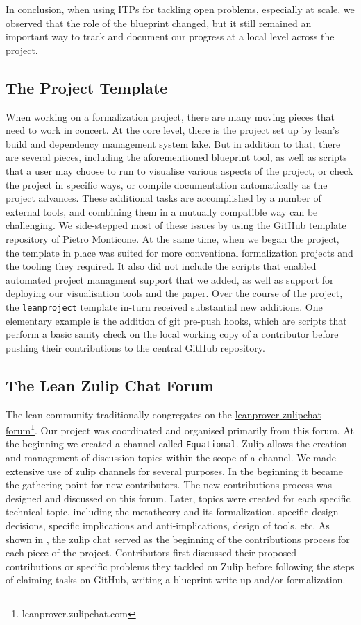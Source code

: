 In conclusion, when using ITPs for tackling open problems, especially at scale, we observed that the role of the blueprint changed, but it still remained an important way to track and document our progress at a local level across the project.

\subsection{The Project Template}
When working on a formalization project, there are many moving pieces that need to work in concert. At the core level, there is the project set up by lean's build and dependency management system lake. But in addition to that, there are several pieces, including the aforementioned blueprint tool, as well as scripts that a user may choose to run to visualise various aspects of the project, or check the project in specific ways, or compile documentation automatically as the project advances. These additional tasks are accomplished by a number of external tools, and combining them in a mutually compatible way can be challenging. We side-stepped most of these issues by using the GitHub template repository of Pietro Monticone\cite{Monticone_LeanProject_2025}. At the same time, when we began the project, the template in place was suited for more conventional formalization projects and the tooling they required. It also did not include the scripts that enabled automated project managment support that we added, as well as support for deploying our visualisation tools and the paper. Over the course of the project, the \texttt{leanproject} template in-turn received substantial new additions. One elementary example is the addition of git pre-push hooks, which are scripts that perform a basic sanity check on the local working copy of a contributor before pushing their contributions to the central GitHub repository.

\subsection{The Lean Zulip Chat Forum}
The lean community traditionally congregates on the \href{leanprover.zulipchat.com}{leanprover zulipchat forum}\footnote{leanprover.zulipchat.com}. Our project was coordinated and organised primarily from this forum. At the beginning we created a channel called \texttt{Equational}. Zulip allows the creation and management of discussion topics within the scope of a channel. We made extensive use of zulip channels for several purposes. In the beginning it became the gathering point for new contributors. The new contributions process was designed and discussed on this forum. Later, topics were created for each specific technical topic, including the metatheory and its formalization, specific design decisions, specific implications and anti-implications, design of tools, etc. As shown in , the zulip chat served as the beginning of the contributions process for each piece of the project. Contributors first discussed their proposed contributions or specific problems they tackled on Zulip before following the steps of claiming tasks on GitHub, writing a blueprint write up and/or formalization.

